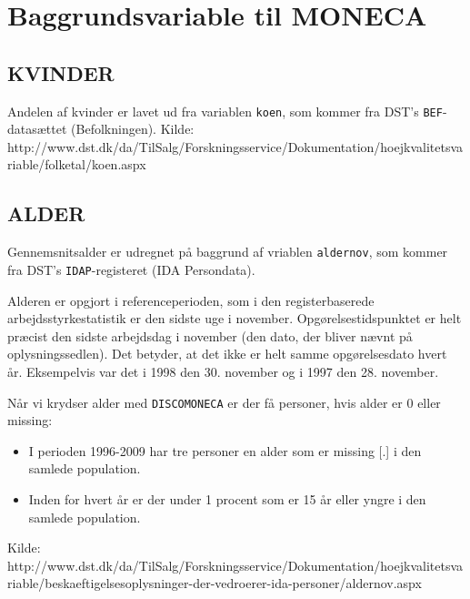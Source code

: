 
\section{Baggrundsvariable til MONECA \label{}}

\subsection{KVINDER \label{}}

Andelen af kvinder er lavet ud fra variablen \texttt{koen}, som kommer fra DST's \texttt{BEF}-datasættet (Befolkningen).
% 
Kilde: http://www.dst.dk/da/TilSalg/Forskningsservice/Dokumentation/hoejkvalitetsvariable/folketal/koen.aspx


\subsection{ALDER \label{}}

Gennemsnitsalder er udregnet på baggrund af vriablen \texttt{aldernov}, som kommer fra DST's \texttt{IDAP}-registeret (IDA Persondata).

Alderen er opgjort i referenceperioden, som i den registerbaserede arbejdsstyrkestatistik er den sidste uge i november. Opgørelsestidspunktet er helt præcist den sidste arbejdsdag i november (den dato, der bliver nævnt på oplysningssedlen). Det betyder, at det ikke er helt samme opgørelsesdato hvert år. Eksempelvis var det i 1998 den 30. november og i 1997 den 28. november.

Når vi krydser alder med \texttt{DISCOMONECA} er der få personer, hvis alder er 0 eller missing:
% 
\begin{itemize}
  \item I perioden 1996-2009 har tre personer en alder som er missing [.] i den samlede population.
  \item Inden for hvert år er der under 1 procent som er 15 år eller yngre i den samlede population.
\end{itemize}
%
Kilde: http://www.dst.dk/da/TilSalg/Forskningsservice/Dokumentation/hoejkvalitetsvariable/beskaeftigelsesoplysninger-der-vedroerer-ida-personer/aldernov.aspx


